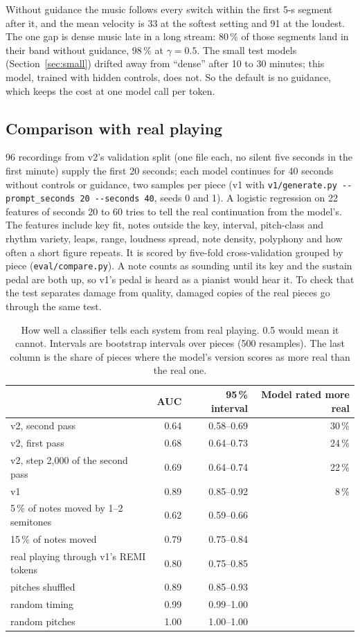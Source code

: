 \documentclass[11pt,a4paper]{article}
\begin{document}
Without guidance the music follows every switch within the first 5-s segment after it, and the mean velocity is
33 at the softest setting and 91 at the loudest. The one gap is dense music late in a long stream: 80\,\% of
those segments land in their band without guidance, 98\,\% at $\gamma = 0.5$. The small test models
(Section~\ref{sec:small}) drifted away from ``dense'' after 10 to 30 minutes; this model, trained with hidden
controls, does not. So the default is no guidance, which keeps the cost at one model call per token.

\subsection{Comparison with real playing}

96 recordings from v2's validation split (one file each, no silent five seconds in the first minute) supply the
first 20 seconds; each model continues for 40 seconds without controls or guidance, two samples per piece (v1 with
\texttt{v1/generate.py -{}-prompt\_seconds 20 -{}-seconds 40}, seeds 0 and 1). A logistic
regression on 22 features of seconds 20 to 60 tries to tell the real continuation from the model's. The features
include key fit, notes outside the key, interval, pitch-class and rhythm variety, leaps, range, loudness spread, note
density, polyphony and how often a short figure repeats. It is scored by five-fold cross-validation grouped by
piece (\texttt{eval/compare.py}). A note counts as sounding until its key and the sustain pedal are both up, so
v1's pedal is heard as a pianist would hear it. To check that the test separates damage from quality, damaged
copies of the real pieces go through the same test.

\begin{table}[h]
\centering\small
\begin{tabular}{lrrr}
\toprule
& AUC & 95\,\% interval & Model rated more real \\
\midrule
v2, second pass & 0.64 & 0.58--0.69 & 30\,\% \\
v2, first pass & 0.68 & 0.64--0.73 & 24\,\% \\
v2, step 2,000 of the second pass & 0.69 & 0.64--0.74 & 22\,\% \\
v1 & 0.89 & 0.85--0.92 & 8\,\% \\
\midrule
5\,\% of notes moved by 1--2 semitones & 0.62 & 0.59--0.66 & \\
15\,\% of notes moved & 0.79 & 0.75--0.84 & \\
real playing through v1's REMI tokens & 0.80 & 0.75--0.85 & \\
pitches shuffled & 0.89 & 0.85--0.93 & \\
random timing & 0.99 & 0.99--1.00 & \\
random pitches & 1.00 & 1.00--1.00 & \\
\bottomrule
\end{tabular}
\caption{How well a classifier tells each system from real playing. 0.5 would mean it cannot. Intervals are
bootstrap intervals over pieces (500 resamples). The last column is the share of pieces where the model's
version scores as more real than the real one.}
\end{table}
\end{document}
